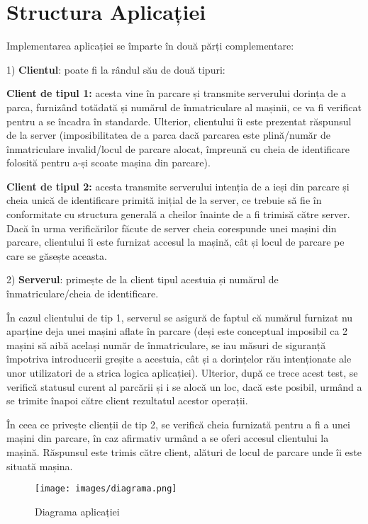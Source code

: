 \documentclass[runningheads]{llncs}
\begin{document}
\section{Structura Aplicației}
Implementarea aplicației se împarte în două părți complementare:
\\
\par 1) \textbf{Clientul}: poate fi la rândul său de două tipuri:
\par \textbf{Client de tipul 1: } acesta vine în parcare și transmite serverului dorința de a parca, furnizând totădată și numărul de înmatriculare al mașinii, ce va fi verificat pentru a se încadra în standarde. Ulterior, clientului îi este prezentat răspunsul de la server (imposibilitatea de a parca dacă parcarea este plină/număr de înmatriculare invalid/locul de parcare alocat, împreună cu cheia de identificare folosită pentru a-și scoate mașina din parcare).
\par \textbf{Client de tipul 2: } acesta transmite serverului intenția de a ieși din parcare și cheia unică de identificare primită inițial de la server, ce trebuie să fie în conformitate cu structura generală a cheilor înainte de a fi trimisă către server. Dacă în urma verificărilor făcute de server cheia corespunde unei mașini din parcare, clientului îi este furnizat accesul la mașină, cât și locul de parcare pe care se găsește aceasta. 

\par 2) \textbf{Serverul}: primește de la client tipul acestuia și numărul de înmatriculare/cheia de identificare. 
\par În cazul clientului de tip 1, serverul se asigură de faptul că numărul furnizat nu aparține deja unei mașini aflate în parcare (deși este conceptual imposibil ca 2 mașini să aibă același număr de înmatriculare, se iau măsuri de siguranță împotriva introducerii greșite a acestuia, cât și a dorințelor rău intenționate ale unor utilizatori de a strica logica aplicației). Ulterior, după ce trece acest test, se verifică statusul curent al parcării și i se alocă un loc, dacă este posibil, urmând a se trimite înapoi către client rezultatul acestor operații. 
\par În ceea ce privește clienții de tip 2, se verifică cheia furnizată pentru a fi a unei mașini din parcare, în caz afirmativ urmând a se oferi accesul clientului la mașină. Răspunsul este trimis către client, alături de locul de parcare unde îi este situată mașina. 

\begin{figure}[h]
    \centering
    \begin{minipage}{1\textwidth}
        \centering
        \texttt{[image: images/diagrama.png]}
        \caption{Diagrama aplicației}
        \label{fig:diagrama}
    \end{minipage}\hfill
\end{figure}
\end{document}
